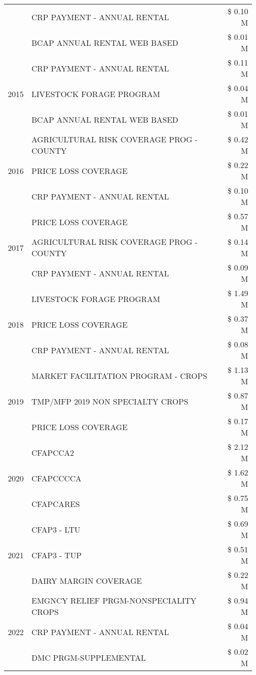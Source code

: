 \begin{tabular}{llr}
 & CRP PAYMENT - ANNUAL RENTAL & \$ 0.10 M \\
 & BCAP ANNUAL RENTAL WEB BASED & \$ 0.01 M \\
\cline{1-3}
\multirow[t]{3}{*}{2015} & CRP PAYMENT - ANNUAL RENTAL & \$ 0.11 M \\
 & LIVESTOCK FORAGE PROGRAM & \$ 0.04 M \\
 & BCAP ANNUAL RENTAL WEB BASED & \$ 0.01 M \\
\cline{1-3}
\multirow[t]{3}{*}{2016} & AGRICULTURAL RISK COVERAGE PROG - COUNTY & \$ 0.42 M \\
 & PRICE LOSS COVERAGE & \$ 0.22 M \\
 & CRP PAYMENT - ANNUAL RENTAL & \$ 0.10 M \\
\cline{1-3}
\multirow[t]{3}{*}{2017} & PRICE LOSS COVERAGE & \$ 0.57 M \\
 & AGRICULTURAL RISK COVERAGE PROG - COUNTY & \$ 0.14 M \\
 & CRP PAYMENT - ANNUAL RENTAL & \$ 0.09 M \\
\cline{1-3}
\multirow[t]{3}{*}{2018} & LIVESTOCK FORAGE PROGRAM & \$ 1.49 M \\
 & PRICE LOSS COVERAGE & \$ 0.37 M \\
 & CRP PAYMENT - ANNUAL RENTAL & \$ 0.08 M \\
\cline{1-3}
\multirow[t]{3}{*}{2019} & MARKET FACILITATION PROGRAM - CROPS & \$ 1.13 M \\
 & TMP/MFP 2019 NON SPECIALTY CROPS & \$ 0.87 M \\
 & PRICE LOSS COVERAGE & \$ 0.17 M \\
\cline{1-3}
\multirow[t]{3}{*}{2020} & CFAPCCA2 & \$ 2.12 M \\
 & CFAPCCCCA & \$ 1.62 M \\
 & CFAPCARES & \$ 0.75 M \\
\cline{1-3}
\multirow[t]{3}{*}{2021} & CFAP3 - LTU & \$ 0.69 M \\
 & CFAP3 - TUP & \$ 0.51 M \\
 & DAIRY MARGIN COVERAGE & \$ 0.22 M \\
\cline{1-3}
\multirow[t]{3}{*}{2022} & EMGNCY RELIEF PRGM-NONSPECIALITY CROPS & \$ 0.94 M \\
 & CRP PAYMENT - ANNUAL RENTAL & \$ 0.04 M \\
 & DMC PRGM-SUPPLEMENTAL & \$ 0.02 M \\
\cline{1-3}
\bottomrule
\end{tabular}
